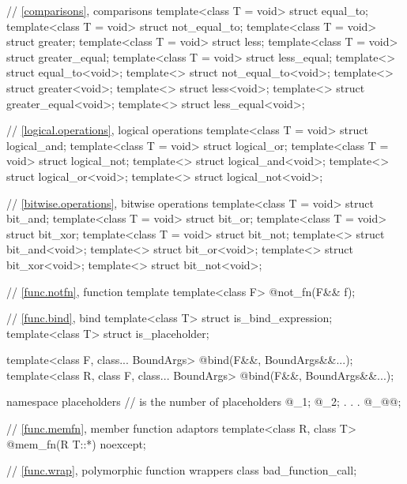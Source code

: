 \documentclass[ebook,11pt,article]{memoir}
\begin{document}
{\begin{removedblock}
\begin{codeblock}
  // \ref{comparisons}, comparisons
  template<class T = void> struct equal_to;
  template<class T = void> struct not_equal_to;
  template<class T = void> struct greater;
  template<class T = void> struct less;
  template<class T = void> struct greater_equal;
  template<class T = void> struct less_equal;
  template<> struct equal_to<void>;
  template<> struct not_equal_to<void>;
  template<> struct greater<void>;
  template<> struct less<void>;
  template<> struct greater_equal<void>;
  template<> struct less_equal<void>;

  // \ref{logical.operations}, logical operations
  template<class T = void> struct logical_and;
  template<class T = void> struct logical_or;
  template<class T = void> struct logical_not;
  template<> struct logical_and<void>;
  template<> struct logical_or<void>;
  template<> struct logical_not<void>;

  // \ref{bitwise.operations}, bitwise operations
  template<class T = void> struct bit_and;
  template<class T = void> struct bit_or;
  template<class T = void> struct bit_xor;
  template<class T = void> struct bit_not;
  template<> struct bit_and<void>;
  template<> struct bit_or<void>;
  template<> struct bit_xor<void>;
  template<> struct bit_not<void>;
\end{codeblock}
\end{removedblock}
\begin{codeblock}

  // \ref{func.notfn}, function template 
  template<class F> @\unspec@ not_fn(F&& f);

  // \ref{func.bind}, bind
  template<class T> struct is_bind_expression;
  template<class T> struct is_placeholder;

  template<class F, class... BoundArgs>
    @\unspec@ bind(F&&, BoundArgs&&...);
  template<class R, class F, class... BoundArgs>
    @\unspec@ bind(F&&, BoundArgs&&...);

  namespace placeholders {
    //  is the  number of placeholders
    @\seebelownc@ _1;
    @\seebelownc@ _2;
               .
               .
               .
    @\seebelownc@ _@@;
  }
 
  // \ref{func.memfn}, member function adaptors
  template<class R, class T>
    @\unspec@ mem_fn(R T::*) noexcept;

  // \ref{func.wrap}, polymorphic function wrappers
  class bad_function_call;


\end{codeblock}}
\end{document}
